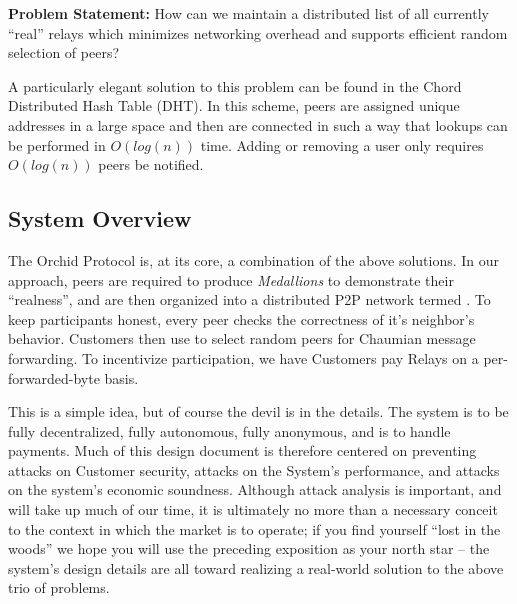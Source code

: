 \textbf{Problem Statement:} How can we maintain a distributed list of
all currently ``real'' relays which minimizes networking overhead and
supports efficient random selection of peers?

A particularly elegant solution to this problem can be found in the
Chord\cite{CHORD} Distributed Hash Table (DHT). In this scheme, peers
are assigned unique addresses in a large space and then are connected
in such a way that lookups can be performed in $O(log(n))$ time. Adding
or removing a user only requires $O(log(n))$ peers be notified.

\subsection{System Overview}

The Orchid Protocol is, at its core, a combination of the above
solutions. In our approach, peers are required to
produce \emph{Medallions} to demonstrate their ``realness'', and are
then organized into a distributed P2P network termed \tOM{}. To
keep \tOM{} participants honest, every peer checks the correctness of
it's neighbor's behavior. Customers then use \tOM{} to select random
peers for Chaumian message forwarding. To incentivize participation,
we have Customers pay Relays on a per-forwarded-byte basis.

This is a simple idea, but of course the devil is in the details. The
system is to be fully decentralized, fully autonomous, fully
anonymous, and is to handle payments. Much of this design document is
therefore centered on preventing attacks on Customer security, attacks
on the System's performance, and attacks on the system's economic
soundness. Although attack analysis is important, and will take up
much of our time, it is ultimately no more than a necessary conceit to
the context in which the market is to operate; if you find yourself
``lost in the woods'' we hope you will use the preceding exposition as
your north star -- the system's design details are all toward
realizing a real-world solution to the above trio of problems.
